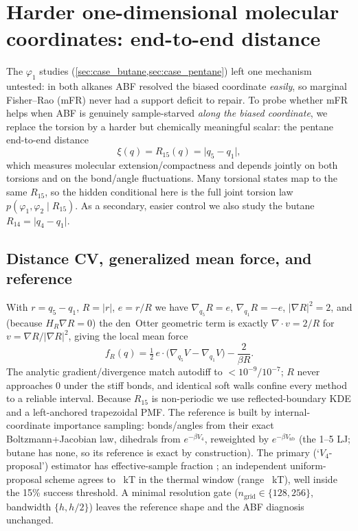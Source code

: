 \section{Harder one-dimensional molecular coordinates: end-to-end distance}
\label{sec:cv_harder_1d}

The $\varphi_1$ studies (\cref{sec:case_butane,sec:case_pentane}) left one mechanism
untested: in both alkanes ABF resolved the biased coordinate \emph{easily}, so marginal
Fisher--Rao (mFR) never had a support deficit to repair. To probe whether mFR helps when
ABF is genuinely sample-starved \emph{along the biased coordinate}, we replace the torsion
by a harder but chemically meaningful scalar: the pentane end-to-end distance
\begin{equation}
  \xi(q) = R_{15}(q) = \lvert q_5 - q_1\rvert ,
\end{equation}
which measures molecular extension/compactness and depends jointly on both torsions and on
the bond/angle fluctuations. Many torsional states map to the same $R_{15}$, so the hidden
conditional here is the full joint torsion law $p(\varphi_1,\varphi_2\mid R_{15})$. As a
secondary, easier control we also study the butane $R_{14}=\lvert q_4-q_1\rvert$.

\subsection{Distance CV, generalized mean force, and reference}
With $r=q_5-q_1$, $R=\lvert r\rvert$, $e=r/R$ we have $\nabla_{q_5}R=e$, $\nabla_{q_1}R=-e$,
$\lvert\nabla R\rvert^2=2$, and (because $H_R\nabla R=0$) the den~Otter geometric term is
exactly $\nabla\!\cdot v = 2/R$ for $v=\nabla R/\lvert\nabla R\rvert^2$, giving the local
mean force
\begin{equation}
  f_R(q) = \tfrac12\,e\cdot\!\big(\nabla_{q_5}V-\nabla_{q_1}V\big) - \frac{2}{\beta R}.
\end{equation}
The analytic gradient/divergence match autodiff to $<10^{-9}/10^{-7}$; $R$ never approaches
$0$ under the stiff bonds, and identical soft walls confine every method to a reliable
interval. Because $R_{15}$ is non-periodic we use reflected-boundary KDE and a
left-anchored trapezoidal PMF. The reference is built by
internal-coordinate importance sampling: bonds/angles from their exact Boltzmann+Jacobian
law, dihedrals from $e^{-\beta V_4}$, reweighted by $e^{-\beta V_\mathrm{nb}}$ (the 1--5 LJ;
butane has none, so its reference is exact by construction). The primary (`$V_4$-proposal')
estimator has effective-sample fraction \CvRfifteenEss; an independent uniform-proposal scheme
agrees to \CvRfifteenCross~kT in the thermal window (range \CvRfifteenRange~kT), well inside the
15\% success threshold. A minimal resolution gate ($n_\mathrm{grid}\in\{128,256\}$,
bandwidth $\{h,h/2\}$) leaves the reference shape and the ABF diagnosis unchanged.

